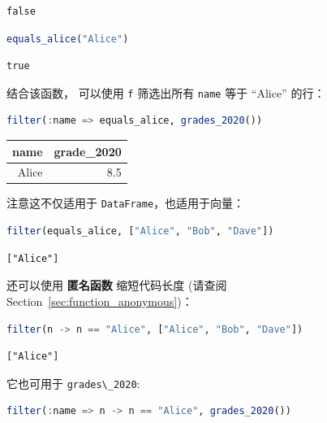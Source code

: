 \documentclass[
  notoc %
]{tufte-book}
\newcommand{\passthrough}[1]{#1}
\begin{document}
\begin{lstlisting}[language=Output]
false
\end{lstlisting}

\begin{lstlisting}[language=Julia]
equals_alice("Alice")
\end{lstlisting}

\begin{lstlisting}[language=Output]
true
\end{lstlisting}

结合该函数， 可以使用 \passthrough{\lstinline!f!} 筛选出所有
\passthrough{\lstinline!name!} 等于 ``Alice'' 的行：

\begin{lstlisting}[language=Julia]
filter(:name => equals_alice, grades_2020())
\end{lstlisting}

\begin{longtable}[]{@{}rr@{}}
\toprule
name & grade\_2020 \\
\midrule
\endhead
Alice & 8.5 \\
\bottomrule
\end{longtable}

注意这不仅适用于 \passthrough{\lstinline!DataFrame!}，也适用于向量：

\begin{lstlisting}[language=Julia]
filter(equals_alice, ["Alice", "Bob", "Dave"])
\end{lstlisting}

\begin{lstlisting}[language=Output]
["Alice"]
\end{lstlisting}

还可以使用 \textbf{匿名函数} 缩短代码长度 (请查阅
Section~\ref{sec:function_anonymous})：

\begin{lstlisting}[language=Julia]
filter(n -> n == "Alice", ["Alice", "Bob", "Dave"])
\end{lstlisting}

\begin{lstlisting}[language=Output]
["Alice"]
\end{lstlisting}

它也可用于 \passthrough{\lstinline!grades\_2020!}:

\begin{lstlisting}[language=Julia]
filter(:name => n -> n == "Alice", grades_2020())
\end{lstlisting}
\end{document}
